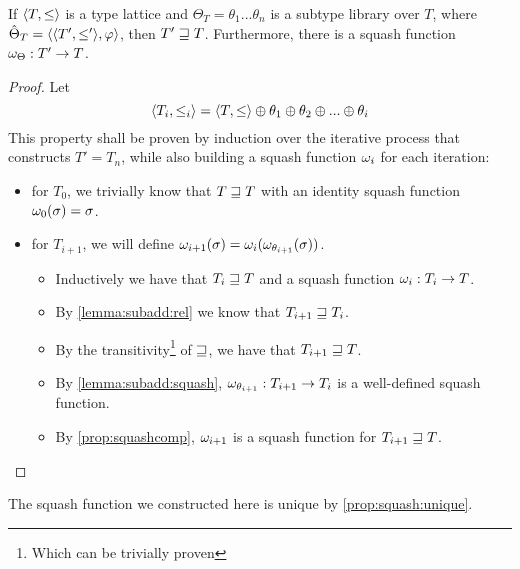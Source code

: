 \documentclass[main.tex]{subfiles}
\begin{document}
\begin{prop}\label{prop:makesquashfun}
    If $\langle  T,  \leq  \rangle$ is a type lattice and
    $\Theta_T = \theta_1 ... \theta_n$ is a subtype library over $T$, where
    $\hat{\Theta}_T = \langle \langle  T',  \leq'  \rangle, \varphi \rangle$,
    then $T' \sqsupseteq T$. Furthermore, there is a squash function
    $\omega_{\Theta} : T' \rightarrow T$.
\end{prop}
\begin{proof}
    Let \[
        \langle  T_i,  \leq_i  \rangle = \langle  T,  \leq  \rangle
        \oplus \theta_1 \oplus \theta_2 \oplus ... \oplus \theta_i
    \]
    This property shall be proven by induction over the iterative process
    that constructs $T' = T_n$, while also building a squash function
    $\omega_i$ for each iteration:
    \begin{itemize}
        \item for $T_0$, we trivially know that $T \sqsupseteq T$ with an identity
            squash function $\omega_0(\sigma) = \sigma$.
        \item for $T_{i + 1}$, we will define
            $\omega_{i + 1}(\sigma) = \omega_i(\omega_{\theta_{i + 1}}(\sigma))$.

            \begin{itemize}
                \item Inductively we have that $T_i \sqsupseteq T$ and a squash function
                    $\omega_i : T_i \rightarrow T$.
                \item By \cref{lemma:subadd:rel} we know that $T_{i + 1} \sqsupseteq T_{i}$.
                \item By the transitivity\footnote{Which can be trivially
                    proven} of $\sqsupseteq$, we have that $T_{i+1} \sqsupseteq T$.
                \item By \cref{lemma:subadd:squash},
                    $\omega_{\theta_{i + 1}} : T_{i + 1} \rightarrow T_i$ is a
                    well-defined squash function.
                \item By \cref{prop:squashcomp}, $\omega_{i + 1}$ is a
                    squash function for $T_{i + 1} \sqsupseteq T$.
            \end{itemize}
    \end{itemize}
\end{proof}

The squash function we constructed here is unique by \cref{prop:squash:unique}.
\end{document}
